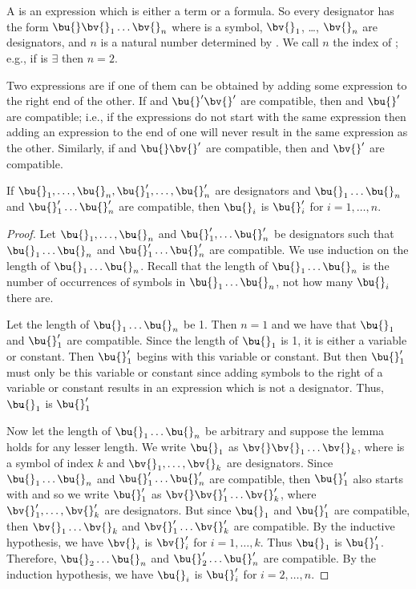 A  is an expression which is either a term or a formula.
So every designator has the form $\bu{}\bv{}_1 \dots \bv{}_n$ where \bu{} is a symbol, $\bv{}_1$, \dots, $\bv{}_n$ are designators, and $n$ is a natural number determined by \bu{}.
We call $n$ the index of \bu{};
e.g., if \bu{} is $\exists$ then $n = 2$.

Two expressions are  if one of them can be obtained by adding some expression to the right end of the other.
If \bu{}\bv{} and $\bu{}'\bv{}'$ are compatible, then \bu{} and $\bu{}'$ are compatible;
i.e., if the expressions do not start with the same expression then adding an expression to the end of one will never result in the same expression as the other.
Similarly, if \bu{}\bv{} and $\bu{}\bv{}'$ are compatible, then \bv{} and $\bv{}'$ are compatible.

\begin{lemma}\label{compatibility lemma}
    If $\bu{}_1, \dots, \bu{}_n, \bu{}_1', \dots, \bu{}_n'$ are designators and $\bu{}_1 \dots \bu{}_n$ and $\bu{}_1' \dots \bu{}_n'$ are compatible, then $\bu{}_i$ is $\bu{}_i'$ for $i = 1,\dots,n$.
\end{lemma}

\begin{proof}
    Let $\bu{}_1, \dots, \bu{}_n$ and $\bu{}_1', \dots \bu{}_n'$ be designators such that $\bu{}_1 \dots \bu{}_n$ and $\bu{}_1' \dots \bu{}_n'$ are compatible.
    We use induction on the length of $\bu{}_1 \dots \bu{}_n$.
    Recall that the length of $\bu{}_1 \dots \bu{}_n$ is the number of occurrences of symbols in $\bu{}_1 \dots \bu{}_n$, not how many $\bu{}_i$ there are.
    
    Let the length of $\bu{}_1 \dots \bu{}_n$ be 1.
    Then $n = 1$ and we have that $\bu{}_1$ and $\bu{}_1'$ are compatible.
    Since the length of $\bu{}_1$ is 1, it is either a variable or constant.
    Then $\bu{}_1'$ begins with this variable or constant.
    But then $\bu{}_1'$ must only be this variable or constant since adding symbols to the right of a variable or constant results in an expression which is not a designator.
    Thus, $\bu{}_1$ is $\bu{}_1'$
    
    Now let the length of $\bu{}_1 \dots \bu{}_n$ be arbitrary and suppose the lemma holds for any lesser length.
    We write $\bu{}_1$ as $\bv{} \bv{}_1 \dots \bv{}_k$, where \bv{} is a symbol of index $k$ and $\bv{}_1, \dots, \bv{}_k$ are designators.
    Since $\bu{}_1 \dots \bu{}_n$ and $\bu{}_1' \dots \bu{}_n'$ are compatible, then $\bu{}_1'$ also starts with \bv{} and so we write $\bu{}_1'$ as $\bv{} \bv{}_1' \dots \bv{}_k'$, where $\bv{}_1', \dots, \bv{}_k'$ are designators.
    But since $\bu{}_1$ and $\bu{}_1'$ are compatible, then $\bv{}_1 \dots \bv{}_k$ and $\bv{}_1' \dots \bv{}_k'$ are compatible.
    By the inductive hypothesis, we have $\bv{}_i$ is $\bv{}_i'$ for $i = 1, \dots, k$.
    Thus $\bu{}_1$ is $\bu{}_1'$.
    Therefore, $\bu{}_2 \dots \bu{}_n$ and $\bu{}_2' \dots \bu{}_n'$ are compatible.
    By the induction hypothesis, we have $\bu{}_i$ is $\bu{}_i'$ for $i = 2, \dots, n$.
\end{proof}

